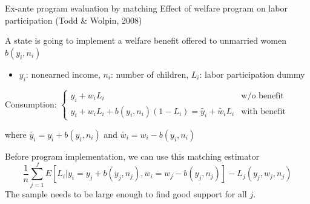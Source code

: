 \documentclass[handout]{beamer}
\begin{document}
\begin{frame}{Ex-ante program evaluation by matching }
	Effect of welfare program on labor participation (Todd \& Wolpin, 2008) \medskip
	
	A state is going to implement a welfare benefit offered to unmarried women $b(y_i,n_i)$
	\begin{itemize}
		\item $y_i$: nonearned income, $n_i$: number of children, $L_i$: labor participation dummy
	\end{itemize}
Consumption: $\begin{cases} y_i+w_iL_i & \text{w/o benefit}\\ y_i+w_iL_i+b(y_i,n_i)(1-L_i)=\tilde{y_i}+\tilde{w_i}L_i & \text{with  benefit} \end{cases}$\medskip

where $\tilde{y_i}=y_i+b(y_i,n_i)$ and $\tilde{w_i}=w_i-b(y_i,n_i)$\medskip

Before program implementation, we can use this matching estimator
\[\frac{1}{n}\sum_{j=1}^{J} E[L_i|y_i=y_j+b(y_j,n_j),w_i=w_j-b(y_j,n_j)] - L_j(y_j,w_j,n_j)\]
The sample needs to be large enough to find good support for all $j$.
\end{frame}


%	
\end{document}

